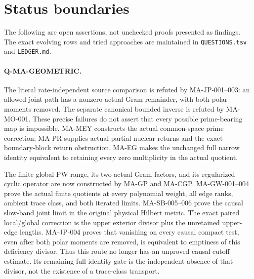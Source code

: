 \documentclass[11pt,a4paper]{article}
\begin{document}
\section{Status boundaries}
The following are open assertions, not unchecked proofs presented
as findings. The exact evolving rows and tried approaches are
maintained in \texttt{QUESTIONS.tsv} and \texttt{LEDGER.md}.

\paragraph{Q-MA-GEOMETRIC.}
The literal rate-independent source comparison is refuted by
MA-JP-001--003: an allowed joint path has a nonzero actual Gram
remainder, with both polar moments removed. The separate canonical
bounded inverse is refuted by MA-MO-001. These precise failures do
not assert that every possible prime-bearing map is impossible.
MA-MEY constructs the actual common-space prime correction;
MA-PR supplies actual partial nuclear returns and the exact
boundary-block return obstruction. MA-EG makes the unchanged
full narrow identity equivalent to retaining every zero
multiplicity in the actual quotient.

The finite global PW range, its two actual Gram factors, and its
regularized cyclic operator are now constructed by MA-GP and
MA-CGP. MA-GW-001--004 prove the actual finite quotients at every
polynomial weight, all edge ranks, ambient trace class, and both
iterated limits. MA-SB-005--006 prove the causal slow-band joint
limit in the original physical Hilbert metric. The exact paired
local/global correction is the upper exterior divisor plus the
unretained upper-edge lengths. MA-JP-004 proves that vanishing
on every causal compact test, even after both polar moments are
removed, is equivalent to emptiness of this deficiency divisor.
Thus this route no longer has an unproved causal cutoff estimate.
Its remaining full-identity gate is the independent absence of
that divisor, not the existence of a trace-class transport.
\end{document}
